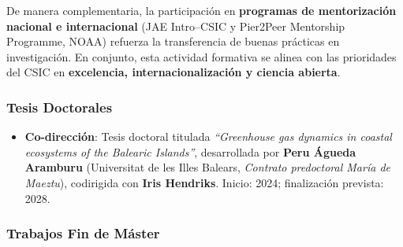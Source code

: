 \documentclass[11pt,a4paper]{article}
\begin{document}
{De manera complementaria, la participación en \textbf{programas de mentorización nacional e internacional} (JAE Intro--CSIC y Pier2Peer Mentorship Programme, NOAA) refuerza la transferencia de buenas prácticas en investigación. En conjunto, esta actividad formativa se alinea con las prioridades del CSIC en \textbf{excelencia, internacionalización y ciencia abierta}.
}


\subsubsection{Tesis Doctorales}

\begin{itemize}[leftmargin=*]
    \item \textbf{Co-dirección}: Tesis doctoral titulada \textit{``Greenhouse gas dynamics in coastal ecosystems of the Balearic Islands''}, desarrollada por \textbf{Peru Águeda Aramburu} (Universitat de les Illes Balears, \textit{Contrato predoctoral María de Maeztu}), codirigida con \textbf{Iris Hendriks}. Inicio: 2024; finalización prevista: 2028.
\end{itemize}

\subsubsection{Trabajos Fin de Máster}
\end{document}
